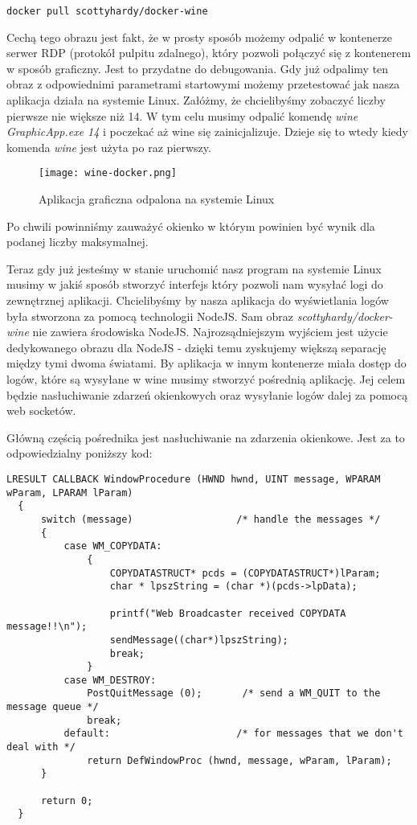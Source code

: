\begin{lstlisting}[caption={Pobierania obrazu który ma zainstalowane środowisko wine}]
  docker pull scottyhardy/docker-wine
\end{lstlisting}
Cechą tego obrazu jest fakt, że w prosty sposób możemy odpalić w kontenerze serwer RDP (protokół pulpitu zdalnego), który pozwoli połączyć się z kontenerem w sposób graficzny. Jest to przydatne do debugowania. Gdy już odpalimy ten obraz z odpowiednimi parametrami startowymi możemy przetestować jak nasza aplikacja działa na systemie Linux. Załóżmy, że chcielibyśmy zobaczyć liczby pierwsze nie większe niż 14. W tym celu musimy odpalić komendę \textit{wine GraphicApp.exe 14} i poczekać aż wine się zainicjalizuje. Dzieje się to wtedy kiedy komenda \textit{wine} jest użyta po raz pierwszy.
\begin{figure}[htbp]
  \centering
  \texttt{[image: wine-docker.png]}
  \caption{Aplikacja graficzna odpalona na systemie Linux}
  \label{fig:wine_docker}
\end{figure}
Po chwili powinniśmy zauważyć okienko w którym powinien być wynik dla podanej liczby maksymalnej.
\par
Teraz gdy już jesteśmy w stanie uruchomić nasz program na systemie Linux musimy w jakiś sposób stworzyć interfejs który pozwoli nam wysyłać logi do zewnętrznej aplikacji. Chcielibyśmy by nasza aplikacja do wyświetlania logów była stworzona za pomocą technologii NodeJS. Sam obraz \textit{scottyhardy/docker-wine} nie zawiera środowiska NodeJS. Najrozsądniejszym wyjściem jest użycie dedykowanego obrazu dla NodeJS - dzięki temu zyskujemy większą separację między tymi dwoma światami. By aplikacja w innym kontenerze miała dostęp do logów, które są wysyłane w wine musimy stworzyć pośrednią aplikację. Jej celem będzie nasłuchiwanie zdarzeń okienkowych oraz wysyłanie logów dalej za pomocą web socketów. 
\par
Główną częścią pośrednika jest nasłuchiwanie na zdarzenia okienkowe. Jest za to odpowiedzialny poniższy kod:
\begin{lstlisting}[caption={Fragment aplikacji odpowiedzialnej za dalsze przekazywanie logów}]
  LRESULT CALLBACK WindowProcedure (HWND hwnd, UINT message, WPARAM wParam, LPARAM lParam)
  {
      switch (message)                  /* handle the messages */
      {
          case WM_COPYDATA:
              {
                  COPYDATASTRUCT* pcds = (COPYDATASTRUCT*)lParam;
                  char * lpszString = (char *)(pcds->lpData);

                  printf("Web Broadcaster received COPYDATA message!!\n");
                  sendMessage((char*)lpszString);
                  break;
              }
          case WM_DESTROY:
              PostQuitMessage (0);       /* send a WM_QUIT to the message queue */
              break;
          default:                      /* for messages that we don't deal with */
              return DefWindowProc (hwnd, message, wParam, lParam);
      }

      return 0;
  }
\end{lstlisting}
